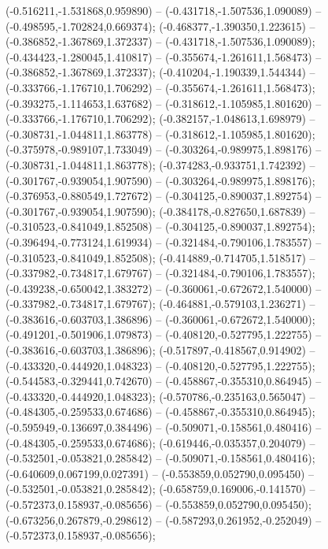  (-0.516211,-1.531868,0.959890) -- (-0.431718,-1.507536,1.090089) -- (-0.498595,-1.702824,0.669374);
 (-0.468377,-1.390350,1.223615) -- (-0.386852,-1.367869,1.372337) -- (-0.431718,-1.507536,1.090089);
 (-0.434423,-1.280045,1.410817) -- (-0.355674,-1.261611,1.568473) -- (-0.386852,-1.367869,1.372337);
 (-0.410204,-1.190339,1.544344) -- (-0.333766,-1.176710,1.706292) -- (-0.355674,-1.261611,1.568473);
 (-0.393275,-1.114653,1.637682) -- (-0.318612,-1.105985,1.801620) -- (-0.333766,-1.176710,1.706292);
 (-0.382157,-1.048613,1.698979) -- (-0.308731,-1.044811,1.863778) -- (-0.318612,-1.105985,1.801620);
 (-0.375978,-0.989107,1.733049) -- (-0.303264,-0.989975,1.898176) -- (-0.308731,-1.044811,1.863778);
 (-0.374283,-0.933751,1.742392) -- (-0.301767,-0.939054,1.907590) -- (-0.303264,-0.989975,1.898176);
 (-0.376953,-0.880549,1.727672) -- (-0.304125,-0.890037,1.892754) -- (-0.301767,-0.939054,1.907590);
 (-0.384178,-0.827650,1.687839) -- (-0.310523,-0.841049,1.852508) -- (-0.304125,-0.890037,1.892754);
 (-0.396494,-0.773124,1.619934) -- (-0.321484,-0.790106,1.783557) -- (-0.310523,-0.841049,1.852508);
 (-0.414889,-0.714705,1.518517) -- (-0.337982,-0.734817,1.679767) -- (-0.321484,-0.790106,1.783557);
 (-0.439238,-0.650042,1.383272) -- (-0.360061,-0.672672,1.540000) -- (-0.337982,-0.734817,1.679767);
 (-0.464881,-0.579103,1.236271) -- (-0.383616,-0.603703,1.386896) -- (-0.360061,-0.672672,1.540000);
 (-0.491201,-0.501906,1.079873) -- (-0.408120,-0.527795,1.222755) -- (-0.383616,-0.603703,1.386896);
 (-0.517897,-0.418567,0.914902) -- (-0.433320,-0.444920,1.048323) -- (-0.408120,-0.527795,1.222755);
 (-0.544583,-0.329441,0.742670) -- (-0.458867,-0.355310,0.864945) -- (-0.433320,-0.444920,1.048323);
 (-0.570786,-0.235163,0.565047) -- (-0.484305,-0.259533,0.674686) -- (-0.458867,-0.355310,0.864945);
 (-0.595949,-0.136697,0.384496) -- (-0.509071,-0.158561,0.480416) -- (-0.484305,-0.259533,0.674686);
 (-0.619446,-0.035357,0.204079) -- (-0.532501,-0.053821,0.285842) -- (-0.509071,-0.158561,0.480416);
 (-0.640609,0.067199,0.027391) -- (-0.553859,0.052790,0.095450) -- (-0.532501,-0.053821,0.285842);
 (-0.658759,0.169006,-0.141570) -- (-0.572373,0.158937,-0.085656) -- (-0.553859,0.052790,0.095450);
 (-0.673256,0.267879,-0.298612) -- (-0.587293,0.261952,-0.252049) -- (-0.572373,0.158937,-0.085656);
